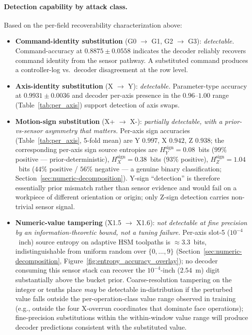 \documentclass[sensors,article,submit,moreauthors,pdftex]{Definitions/mdpi}
\begin{document}
\paragraph{Detection capability by attack class.} Based on the per-field recoverability characterization above:
\begin{itemize}
\item \textbf{Command-identity substitution} (G0 $\to$ G1, G2 $\to$ G3): \emph{detectable.} Command-accuracy at $0.8875 \pm 0.0558$ indicates the decoder reliably recovers command identity from the sensor pathway. A substituted command produces a controller-log vs.\ decoder disagreement at the row level.
\item \textbf{Axis-identity substitution} (X $\to$ Y): \emph{detectable.} Parameter-type accuracy at $0.9931 \pm 0.0036$ and decoder per-axis presence in the $0.96$--$1.00$ range (Table~\ref{tab:per_axis}) support detection of axis swaps.
\item \textbf{Motion-sign substitution} (X+ $\to$ X-): \emph{partially detectable, with a prior-vs-sensor asymmetry that matters.} Per-axis sign accuracies (Table~\ref{tab:per_axis}, 5-fold mean) are Y $0.997$, X $0.942$, Z $0.938$; the corresponding per-axis sign source entropies are $H_{Y}^{\text{sign}} = 0.08$~bits ($99\%$ positive --- prior-deterministic), $H_{X}^{\text{sign}} = 0.38$~bits ($93\%$ positive), $H_{Z}^{\text{sign}} = 1.04$~bits ($44\%$ positive / $56\%$ negative --- a genuine binary classification; Section~\ref{sec:numeric-decomposition}). Y-sign ``detection'' is therefore essentially prior mismatch rather than sensor evidence and would fail on a workpiece of different orientation or origin; only Z-sign detection carries non-trivial sensor signal.
\item \textbf{Numeric-value tampering} (X1.5 $\to$ X1.6): \emph{not detectable at fine precision by an information-theoretic bound, not a tuning failure.} Per-axis slot-5 ($10^{-4}$~inch) source entropy on adaptive HSM toolpaths is $\approx 3.3$~bits, indistinguishable from uniform random over $\{0,\ldots,9\}$ (Section~\ref{sec:numeric-decomposition}, Figure~\ref{fig:entropy_accuracy_overlay}); no decoder consuming this sensor stack can recover the $10^{-4}$-inch ($2.54$~\textmu m) digit substantially above the bucket prior. Coarse-resolution tampering on the integer or tenths place \emph{may} be detectable in-distribution if the perturbed value falls outside the per-operation-class value range observed in training (e.g., outside the four X-overrun coordinates that dominate face operations); fine-precision substitutions within the within-window value range will produce decoder predictions consistent with the substituted value.

\end{itemize}
\end{document}
